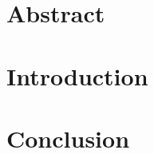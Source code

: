 \newcommand{\add}[1]{}

\chapter*{Abstract}


\chapter{Introduction}
\add{introduction}

\chapter{Conclusion}
\add{conclusion}